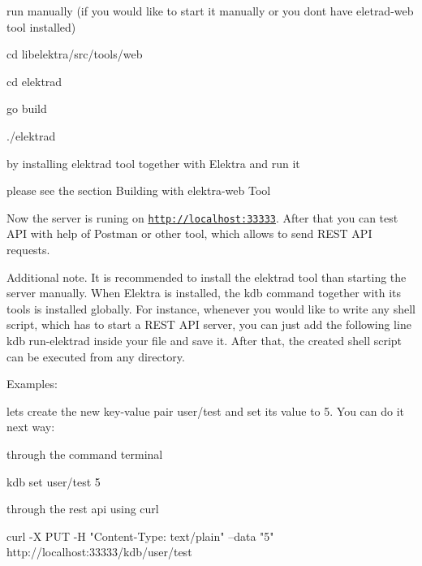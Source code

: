 \begin{DoxyItemize}
\item run manually (if you would like to start it manually or you don\textquotesingle{}t have eletrad-\/web tool installed)
\begin{DoxyItemize}
\item {\ttfamily cd libelektra/src/tools/web}
\item {\ttfamily cd elektrad}
\item {\ttfamily go build}
\item {\ttfamily ./elektrad}
\end{DoxyItemize}
\item by installing elektrad tool together with Elektra and run it
\begin{DoxyItemize}
\item please see the section {\ttfamily Building with elektra-\/web Tool}
\end{DoxyItemize}
\end{DoxyItemize}

Now the server is runing on \href{http://localhost:33333}{\tt http\+://localhost\+:33333}. After that you can test A\+PI with help of Postman or other tool, which allows to send R\+E\+ST A\+PI requests.

Additional note. It is recommended to install the elektrad tool than starting the server manually. When Elektra is installed, the {\ttfamily kdb} command together with its tools is installed globally. For instance, whenever you would like to write any shell script, which has to start a R\+E\+ST A\+PI server, you can just add the following line {\ttfamily kdb run-\/elektrad} inside your file and save it. After that, the created shell script can be executed from any directory.

Examples\+:

let\textquotesingle{}s create the new key-\/value pair {\ttfamily user/test} and set its value to 5. You can do it next way\+:


\begin{DoxyItemize}
\item through the command terminal 
\begin{DoxyCode}
kdb set user/test 5
\end{DoxyCode}

\item through the rest api using curl 
\begin{DoxyCode}
curl -X PUT -H "Content-Type: text/plain" --data "5" http://localhost:33333/kdb/user/test
\end{DoxyCode}

\end{DoxyItemize}

